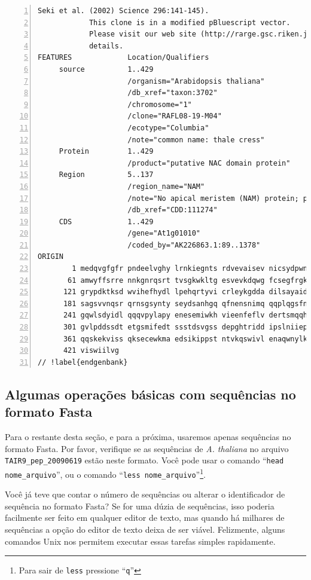 \documentclass[letter,11pt]{book}
\begin{document}
\begin{Verbatim}[commandchars=!\{\},numbers=left,firstnumber=last,label=Sequência em formato GenBank,frame=topline,fontsize=\tiny]
            Seki et al. (2002) Science 296:141-145).
            This clone is in a modified pBluescript vector.
            Please visit our web site (http://rarge.gsc.riken.jp/) for further
            details.
FEATURES             Location/Qualifiers
     source          1..429
                     /organism="Arabidopsis thaliana"
                     /db_xref="taxon:3702"
                     /chromosome="1"
                     /clone="RAFL08-19-M04"
                     /ecotype="Columbia"
                     /note="common name: thale cress"
     Protein         1..429
                     /product="putative NAC domain protein"
     Region          5..137
                     /region_name="NAM"
                     /note="No apical meristem (NAM) protein; pfam02365"
                     /db_xref="CDD:111274"
     CDS             1..429
                     /gene="At1g01010"
                     /coded_by="AK226863.1:89..1378"
ORIGIN      
        1 medqvgfgfr pndeelvghy lrnkiegnts rdvevaisev nicsydpwnl rfqskyksrd
       61 amwyffsrre nnkgnrqsrt tvsgkwkltg esvevkdqwg fcsegfrgki ghkrvlafld
      121 grypdktksd wvihefhydl lpehqrtyvi crleykgdda dilsayaidp tpafvpnmts
      181 sagsvvnqsr qrnsgsynty seydsanhgq qfnensnimq qqplqgsfnp lleydfanhg
      241 gqwlsdyidl qqqvpylapy enesemiwkh vieenfeflv dertsmqqhy sdhrpkkpvs
      301 gvlpddssdt etgsmifedt ssstdsvgss depghtridd ipslniiepl hnykaqeqpk
      361 qqskekviss qksecewkma edsikippst ntvkqswivl enaqwnylkn miigvllfis
      421 viswiilvg
// !label{endgenbank}
\end{Verbatim} 

\subsection{Algumas operações básicas com sequências no formato Fasta}

Para o restante desta seção, e para a próxima, usaremos apenas sequências no formato Fasta. Por favor, verifique se as sequências de \textit{A. thaliana} no arquivo \Verb+TAIR9_pep_20090619+ estão neste formato. Você pode usar o comando ``\Verb+head nome_arquivo+'', ou o comando ``\Verb+less nome_arquivo+''\footnote{Para sair de \Verb+less+ pressione ``\Verb+q+''}.

Você já teve que contar o número de sequências ou alterar o identificador de sequência no formato Fasta? Se for uma dúzia de sequências, isso poderia facilmente ser feito em qualquer editor de texto, mas quando há milhares de sequências a opção do editor de texto deixa de ser viável. Felizmente, alguns comandos Unix nos permitem executar essas tarefas simples rapidamente.
\end{document}

